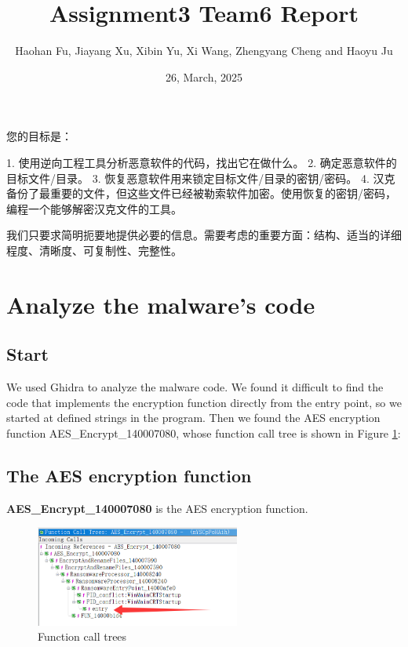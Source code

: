 \documentclass[11pt]{article}
\begin{document}
\title{Assignment3 Team6 Report}
\author{Haohan Fu, Jiayang Xu, Xibin Yu, Xi Wang, Zhengyang Cheng and Haoyu Ju}
\date{26, March, 2025}
\maketitle

您的目标是：

1. 使用逆向工程工具分析恶意软件的代码，找出它在做什么。
2. 确定恶意软件的目标文件/目录。
3. 恢复恶意软件用来锁定目标文件/目录的密钥/密码。
4. 汉克备份了最重要的文件，但这些文件已经被勒索软件加密。使用恢复的密钥/密码，编程一个能够解密汉克文件的工具。

我们只要求简明扼要地提供必要的信息。需要考虑的重要方面：结构、适当的详细程度、清晰度、可复制性、完整性。

\section{Analyze the malware's code}
\subsection{Start}
We used Ghidra to analyze the malware code. We found it difficult to find the code that implements the encryption function directly from the entry point, so we started at defined strings in the program. Then we found the AES encryption function AES\_Encrypt\_140007080, whose function call tree is shown in Figure \ref{Call Trees}:

\subsection{The AES encryption function}
\textbf{AES\_Encrypt\_140007080} is the AES encryption function.
\begin{figure}[htbp]
    \centering
    \includegraphics[width=0.6\textwidth]{img/Call Trees.png}
    \caption{Function call trees}
    \label{Call Trees}
\end{figure}
\end{document}
